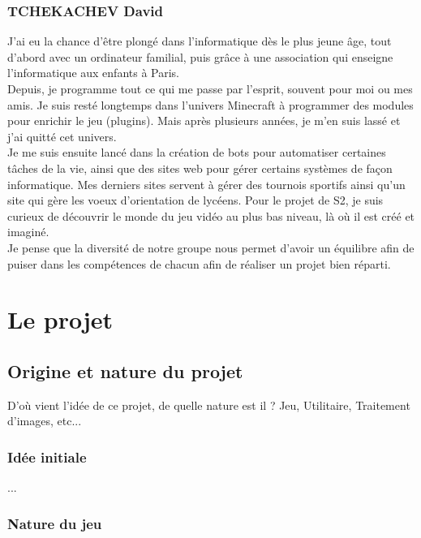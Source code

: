 \documentclass{article}
\begin{document}
\subsubsection{TCHEKACHEV David}

J'ai eu la chance d'être plongé dans l'informatique dès le plus jeune âge, tout d'abord avec un ordinateur familial, puis grâce à une association qui enseigne l'informatique aux enfants à Paris.\\
Depuis, je programme tout ce qui me passe par l'esprit, souvent pour moi ou mes amis. Je suis resté longtemps dans l'univers Minecraft à programmer des modules pour enrichir le jeu (plugins). Mais après plusieurs années, je m'en suis lassé et j'ai quitté cet univers. \\
Je me suis ensuite lancé dans la création de bots pour automatiser certaines tâches de la vie, ainsi que des sites web pour gérer certains systèmes de façon informatique. Mes derniers sites servent à gérer des tournois sportifs ainsi qu'un site qui gère les voeux d'orientation de lycéens.
Pour le projet de S2, je suis curieux de découvrir le monde du jeu vidéo au plus bas niveau, là où il est créé et imaginé. \\
Je pense que la diversité de notre groupe nous permet d'avoir un équilibre afin de puiser dans les compétences de chacun afin de réaliser un projet bien réparti.

\pagebreak

\section{Le projet}

\subsection{Origine et nature du projet}

D’où vient l’idée de ce projet, de quelle nature est il ? Jeu, Utilitaire, Traitement d’images, etc...

\subsubsection{Idée initiale}

...

\subsubsection{Nature du jeu}
\end{document}
